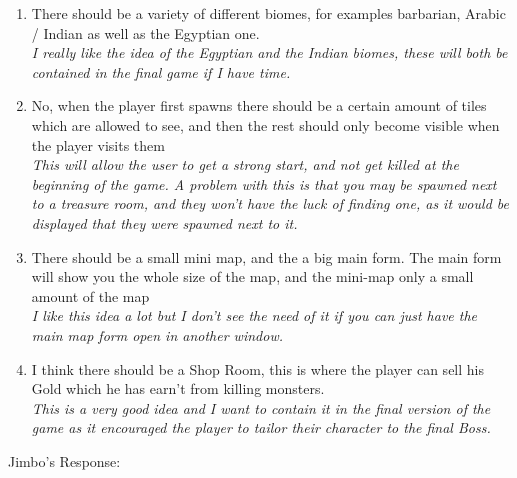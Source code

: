 \documentclass[12pt]{article}
\begin{document}
\begin{enumerate}
	\item{There should be a variety of different biomes, for examples barbarian, Arabic / Indian as well as the Egyptian one.\\}
	\em{I really like the idea of the Egyptian and the Indian biomes, these will both be contained in the final game if I have time.}
	
	\item{No, when the player first spawns there should be a certain amount of tiles which are allowed to see, and then the rest should only become visible when the player visits them \\}
	\em{This will allow the user to get a strong start, and not get killed at the beginning of the game. A problem with this is that you may be spawned next to a treasure room, and they won't have the luck of finding one, as it would be displayed that they were spawned next to it.}
	
	\item{There should be a small mini map, and the a big main form. The main form will show you the whole size of the map, and the mini-map only a small amount of the map \\}
	\em{I like this idea a lot but I don't see the need of it if you can just have the main map form open in another window.}
	
	\item{I think there should be a Shop Room, this is where the player can sell his Gold which he has earn't from killing monsters. \\}
	\em{This is a very good idea and I want to contain it in the final version of the game as it encouraged the player to tailor their character to the final Boss.}
\end{enumerate}





\centerline{Jimbo's Response:}
\end{document}

